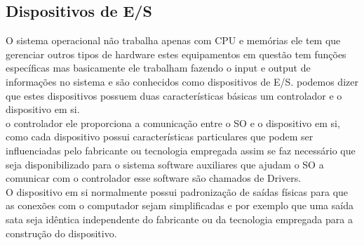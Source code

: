\subsection{Dispositivos de E/S}
O sistema operacional não trabalha apenas com CPU e memórias ele tem que gerenciar outros tipos de hardware estes equipamentos em questão tem funções específicas mas basicamente ele trabalham fazendo o input e output de informações no sistema e são conhecidos como dispositivos de E/S. podemos dizer que estes dispositivos possuem duas características básicas um controlador e o dispositivo em si.\\
o controlador ele proporciona a comunicação entre o SO e o dispositivo em si, como cada dispositivo possui características particulares que podem ser influenciadas pelo fabricante ou tecnologia empregada assim se faz necessário que seja disponibilizado para o sistema software auxiliares que ajudam o SO a comunicar com o controlador esse software são chamados de Drivers.\\
O dispositivo em si normalmente possui padronização de saídas físicas para que as conexões com o computador sejam simplificadas e por exemplo que uma saída sata seja idêntica independente do fabricante ou da tecnologia empregada para a construção do dispositivo.
